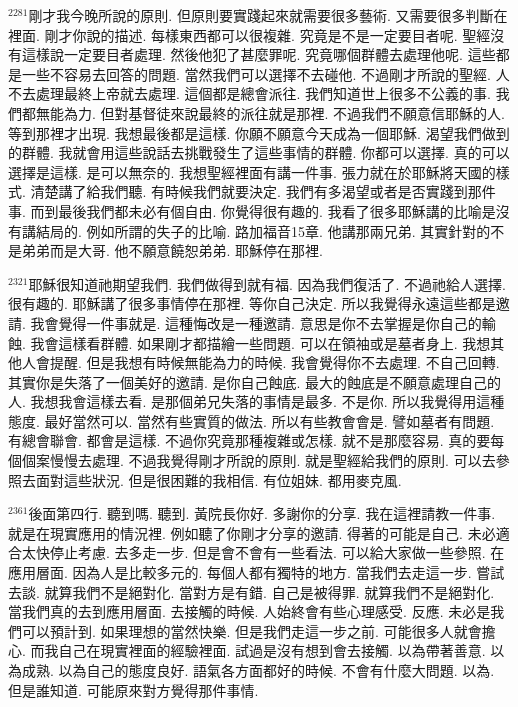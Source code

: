 \documentclass{book}
\begin{document}
$^{2281}$剛才我今晚所說的原則.
但原則要實踐起來就需要很多藝術.
又需要很多判斷在裡面.
剛才你說的描述.
每樣東西都可以很複雜.
究竟是不是一定要目者呢.
聖經沒有這樣說一定要目者處理.
然後他犯了甚麼罪呢.
究竟哪個群體去處理他呢.
這些都是一些不容易去回答的問題.
當然我們可以選擇不去碰他.
不過剛才所說的聖經.
人不去處理最終上帝就去處理.
這個都是總會派往.
我們知道世上很多不公義的事.
我們都無能為力.
但對基督徒來說最終的派往就是那裡.
不過我們不願意信耶穌的人.
等到那裡才出現.
我想最後都是這樣.
你願不願意今天成為一個耶穌.
渴望我們做到的群體.
我就會用這些說話去挑戰發生了這些事情的群體.
你都可以選擇.
真的可以選擇是這樣.
是可以無奈的.
我想聖經裡面有講一件事.
張力就在於耶穌將天國的樣式.
清楚講了給我們聽.
有時候我們就要決定.
我們有多渴望或者是否實踐到那件事.
而到最後我們都未必有個自由.
你覺得很有趣的.
我看了很多耶穌講的比喻是沒有講結局的.
例如所謂的失子的比喻.
路加福音15章.
他講那兩兄弟.
其實針對的不是弟弟而是大哥.
他不願意饒恕弟弟.
耶穌停在那裡.

$^{2321}$耶穌很知道祂期望我們.
我們做得到就有福.
因為我們復活了.
不過祂給人選擇.
很有趣的.
耶穌講了很多事情停在那裡.
等你自己決定.
所以我覺得永遠這些都是邀請.
我會覺得一件事就是.
這種悔改是一種邀請.
意思是你不去掌握是你自己的輸蝕.
我會這樣看群體.
如果剛才都描繪一些問題.
可以在領袖或是墓者身上.
我想其他人會提醒.
但是我想有時候無能為力的時候.
我會覺得你不去處理.
不自己回轉.
其實你是失落了一個美好的邀請.
是你自己蝕底.
最大的蝕底是不願意處理自己的人.
我想我會這樣去看.
是那個弟兄失落的事情是最多.
不是你.
所以我覺得用這種態度.
最好當然可以.
當然有些實質的做法.
所以有些教會會是.
譬如墓者有問題.
有總會聯會.
都會是這樣.
不過你究竟那種複雜或怎樣.
就不是那麼容易.
真的要每個個案慢慢去處理.
不過我覺得剛才所說的原則.
就是聖經給我們的原則.
可以去參照去面對這些狀況.
但是很困難的我相信.
有位姐妹.
都用麥克風.

$^{2361}$後面第四行.
聽到嗎.
聽到.
黃院長你好.
多謝你的分享.
我在這裡請教一件事.
就是在現實應用的情況裡.
例如聽了你剛才分享的邀請.
得著的可能是自己.
未必適合太快停止考慮.
去多走一步.
但是會不會有一些看法.
可以給大家做一些參照.
在應用層面.
因為人是比較多元的.
每個人都有獨特的地方.
當我們去走這一步.
嘗試去談.
就算我們不是絕對化.
當對方是有錯.
自己是被得罪.
就算我們不是絕對化.
當我們真的去到應用層面.
去接觸的時候.
人始終會有些心理感受.
反應.
未必是我們可以預計到.
如果理想的當然快樂.
但是我們走這一步之前.
可能很多人就會擔心.
而我自己在現實裡面的經驗裡面.
試過是沒有想到會去接觸.
以為帶著善意.
以為成熟.
以為自己的態度良好.
語氣各方面都好的時候.
不會有什麼大問題.
以為.
但是誰知道.
可能原來對方覺得那件事情.
\end{document}
